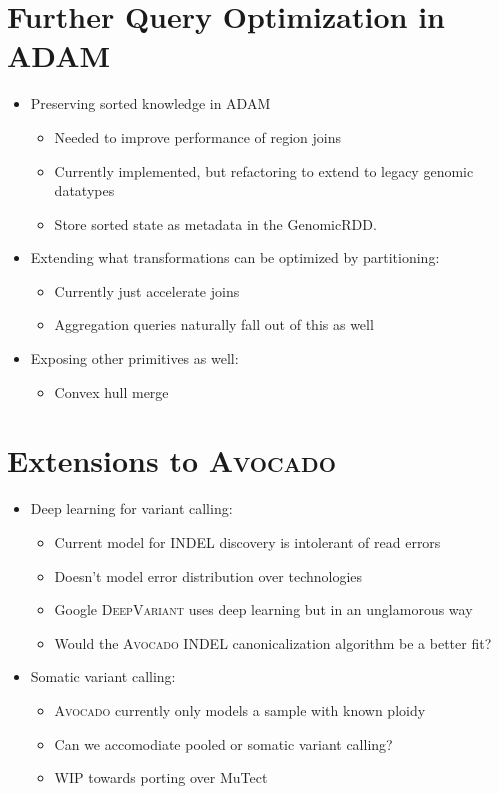 \documentclass[phd]{ucbthesis}
\begin{document}
\section{Further Query Optimization in \textsc{ADAM}}
\label{sec:extensions-adam}

\begin{itemize}
\item Preserving sorted knowledge in \textsc{ADAM}
  \begin{itemize}
  \item Needed to improve performance of region joins
  \item Currently implemented, but refactoring to extend to legacy genomic datatypes
  \item Store sorted state as metadata in the GenomicRDD.
  \end{itemize}
\item Extending what transformations can be optimized by partitioning:
  \begin{itemize}
  \item Currently just accelerate joins
  \item Aggregation queries naturally fall out of this as well
  \end{itemize}
\item Exposing other primitives as well:
  \begin{itemize}
  \item Convex hull merge
  \end{itemize}
\end{itemize}

\section{Extensions to \textsc{Avocado}}
\label{sec:extending-avocado}

\begin{itemize}
\item Deep learning for variant calling:
  \begin{itemize}
  \item Current model for INDEL discovery is intolerant of read errors
  \item Doesn't model error distribution over technologies
  \item Google \textsc{DeepVariant} uses deep learning but in an unglamorous way
  \item Would the \textsc{Avocado} INDEL canonicalization algorithm be a better fit?
  \end{itemize}
\item Somatic variant calling:
  \begin{itemize}
  \item \textsc{Avocado} currently only models a sample with known ploidy
  \item Can we accomodiate pooled or somatic variant calling?
  \item WIP towards porting over MuTect
  \end{itemize}
\end{itemize}
\end{document}
